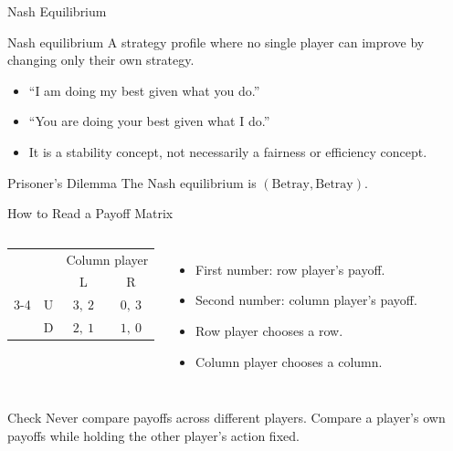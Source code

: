 \documentclass[10pt,aspectratio=169]{beamer}
\newcommand{\pay}[2]{#1,\ #2}
\begin{document}
\begin{frame}{Nash Equilibrium}
\begin{block}{Nash equilibrium}
A strategy profile where no single player can improve by changing only their own strategy.
\end{block}
\vspace{0.2cm}
\begin{itemize}
  \item ``I am doing my best given what you do.''
  \item ``You are doing your best given what I do.''
  \item It is a stability concept, not necessarily a fairness or efficiency concept.
\end{itemize}
\vspace{0.3cm}
\begin{block}{Prisoner's Dilemma}
The Nash equilibrium is $(\text{Betray}, \text{Betray})$.
\end{block}
\end{frame}

\begin{frame}{How to Read a Payoff Matrix}
\begin{columns}[T]
\begin{center}
\begin{tabular}{c c c c}
 & & \multicolumn{2}{c}{Column player}\\
 & & L & R\\
\cmidrule{3-4}
\multirow{2}{*}{Row player} & U & $\pay{3}{2}$ & $\pay{0}{3}$\\
 & D & $\pay{2}{1}$ & $\pay{1}{0}$\\
\end{tabular}
\end{center}
\begin{itemize}
  \item First number: row player's payoff.
  \item Second number: column player's payoff.
  \item Row player chooses a row.
  \item Column player chooses a column.
\end{itemize}
\end{columns}
\vspace{0.25cm}
\begin{block}{Check}
Never compare payoffs across different players. Compare a player's own payoffs while holding the other player's action fixed.
\end{block}
\end{frame}
\end{document}
